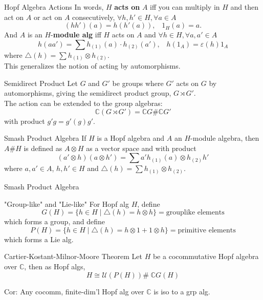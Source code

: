 \documentclass{beamer}
\newcommand\1{_{(1)}}
\newcommand\2{_{(2)}}
\begin{document}
\begin{frame}{Hopf Algebra Actions}
In words, $H$ \textbf{acts on} $A$ iff you can multiply in $H$ and then act on $A$ or act on $A$ consecutively, $\forall h,h'\in H,\forall a\in A$
\[
(hh')(a)=h(h'(a)),\;\;\; 1_H(a)=a. 
\]
And $A$ is an $H$-\textbf{module alg} iff $H$ acts on $A$ and $\forall h\in H,\forall a,a'\in A$
\[
h(aa')=\sum h\1(a)\cdot h\2(a'),\;\;\; h(1_A)=\varepsilon(h)1_A    
\]
where $\triangle(h)=\sum h\1\otimes h\2$.
\\ This generalizes the notion of acting by automorphisms.

\end{frame}

\begin{frame}{Semidirect Product}
    Let $G$ and $G'$ be groups where $G'$ acts on $G$ by automorphisms, giving the semidirect product group, $G\rtimes G'$.\\
    The action can be extended to the group algebras:
    \[
    \mathbb{C}(G\rtimes G')=\mathbb{C}G\#\mathbb{C}G'    
    \]
    with product $g'g=g'(g)g'$.\\
    \begin{block}{Smash Product Algebra}
        If $H$ is a Hopf algebra and $A$ an $H$-module algebra, then $A\#H$ is defined as $A\otimes H$ as a vector space and with product
        \[
        (a'\otimes h)(a\otimes h')=\sum a'h\1(a)\otimes h\2h' 
        \]
        where $a,a'\in A$, $h,h'\in H$ and $\triangle(h)=\sum h\1\otimes h\2$.
    \end{block}
\end{frame}

\begin{frame}{Smash Product Algebra}
    \begin{block}{"Group-like" and "Lie-like"}
        For Hopf alg $H$, define \[G(H)=\{h\in H\;\vert\; \triangle(h)=h\otimes h\}=\text{grouplike elements}\] 
        which forms a group, and define 
        \[P(H)=\{h\in H\;\vert\; \triangle(h)=h\otimes 1+1\otimes h\}=\text{primitive elements}\]
        which forms a Lie alg.
    \end{block}
    \begin{block}{Cartier-Kostant-Milnor-Moore Theorem}
        Let $H$ be a cocommutative Hopf algebra over $\mathbb{C}$, then as Hopf algs,
        \[
            H\cong \mathcal{U}\left(P(H)\right)\# \;\mathbb{C}G(H)
        \]
    \end{block}
    Cor: Any cocomm, finite-dim'l Hopf alg over $\mathbb{C}$ is iso to a grp alg.
\end{frame}
\end{document}

